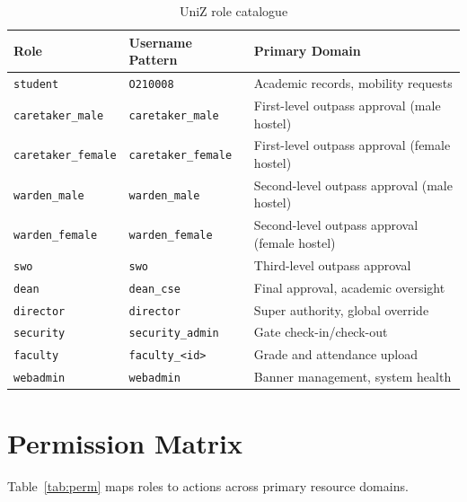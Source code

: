 \documentclass[12pt,a4paper]{report}
\newcommand{\code}[1]{\texttt{#1}}
\begin{document}
\begin{table}[H]
\centering
\caption{UniZ role catalogue}
\label{tab:roles}
\renewcommand{\arraystretch}{1.3}
\begin{tabularx}{\textwidth}{llX}
\toprule
\textbf{Role} & \textbf{Username Pattern} & \textbf{Primary Domain} \\
\midrule
\code{student}           & \code{O210008}             & Academic records, mobility requests \\
\code{caretaker\_male}   & \code{caretaker\_male}     & First-level outpass approval (male hostel) \\
\code{caretaker\_female} & \code{caretaker\_female}   & First-level outpass approval (female hostel) \\
\code{warden\_male}      & \code{warden\_male}        & Second-level outpass approval (male hostel) \\
\code{warden\_female}    & \code{warden\_female}      & Second-level outpass approval (female hostel) \\
\code{swo}               & \code{swo}                 & Third-level outpass approval \\
\code{dean}              & \code{dean\_cse}           & Final approval, academic oversight \\
\code{director}          & \code{director}            & Super authority, global override \\
\code{security}          & \code{security\_admin}     & Gate check-in/check-out \\
\code{faculty}           & \code{faculty\_<id>}       & Grade and attendance upload \\
\code{webadmin}         & \code{webadmin}           & Banner management, system health \\
\bottomrule
\end{tabularx}
\end{table}

\section{Permission Matrix}

Table~\ref{tab:perm} maps roles to actions across primary resource domains.
\end{document}
